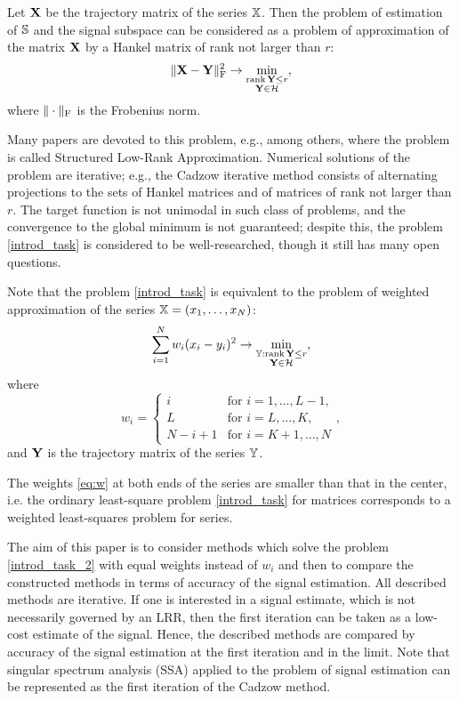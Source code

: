 \documentclass[sii]{ipart}
\def\rank{\mathop{\mathrm{rank}}}
\begin{document}
Let $\mathbf{X}$ be the trajectory matrix of the series $\mathbb{X}$. Then the problem of estimation of $\mathbb{S}$ and the signal subspace can be considered as a problem of approximation of the matrix $\mathbf{X}$ by a Hankel matrix of rank not larger than $r$:
\begin{equation}\label{introd_task}
\|\bfX - \bfY\|^2_\rmF \to \min_{\substack{\rank \bfY \le r \\ \bfY \in \calH}},
\end{equation}
where $\|\cdot\|_{\mathrm{F}}$ is the Frobenius norm.

Many papers are devoted to this problem, e.g., \cite{Cadzow1988, Markovsky2011, Usevich.Markovsky2014, Gillard.Zhigljavsky2013} among others, where the problem is called Structured Low-Rank Approximation. Numerical solutions of the problem are iterative; e.g., the Cadzow iterative method \cite{Cadzow1988} consists of alternating projections to the sets of Hankel matrices and of matrices of rank not larger than $r$. The target function is not unimodal in such class of problems, and the convergence to the global minimum is not guaranteed; despite this, the problem \eqref{introd_task} is considered to be well-researched, though it still has many open questions.

Note that the problem \eqref{introd_task} is equivalent to the problem of weighted approximation of the series $\mathbb{X} = (x_1, \ldots, x_N)$:
\begin{equation}\label{introd_task_2}
\sum_{i = 1}^N w_i(x_i - y_i)^2 \to \min_{\substack{\tsY: \rank \bfY \le r \\ \bfY \in \calH}},
\end{equation}
where
\begin{equation}
\label{eq:w}
w_i = \begin{cases}
i & \text{for $i = 1, \ldots, L-1,$}\\
L & \text{for $i = L, \ldots, K,$}\\
N - i + 1 & \text{for $i = K + 1, \ldots, N$}
\end{cases},
\end{equation}
and $\mathbf{Y}$ is the  trajectory matrix of the series $\mathbb{Y}$.

The weights \eqref{eq:w} at both ends of the series are smaller than that in the center, i.e. the ordinary least-square problem \eqref{introd_task} for matrices corresponds to a weighted least-squares problem for series.

The aim of this paper is to consider methods which solve the problem \eqref{introd_task_2} with equal weights instead of $w_i$ and then to compare the constructed methods in terms of accuracy of the signal estimation. All described methods are iterative.
If one is interested in a signal estimate, which is not necessarily governed by an LRR, then the first iteration can be taken as a low-cost estimate of the signal.
Hence, the described methods are compared by accuracy of the signal estimation at the first iteration and in the limit. Note that singular spectrum analysis (SSA) \cite{Broomhead.King1986, Vautard.etal1992, Elsner.Tsonis1996, Golyandina.etal2001, Ghil.etal2002, Golyandina.Zhigljavsky2012} applied to the problem of signal estimation can be represented as the first iteration of the Cadzow method.
\end{document}

